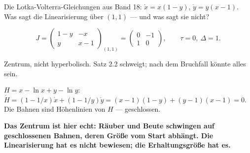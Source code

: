 \begin{aufgabe}
Die Lotka-Volterra-Gleichungen aus Band 18: $\dot x = x(1-y)$, $\dot y = y(x-1)$. Was sagt die Linearisierung über $(1,1)$ --- und was sagt sie nicht?

\loesung
{}
\[ J = \begin{pmatrix} 1-y & -x \\ y & x-1 \end{pmatrix}_{(1,1)} = \begin{pmatrix} 0 & -1 \\ 1 & 0 \end{pmatrix}, \qquad \tau = 0, \ \Delta = 1 . \]

Zentrum, nicht hyperbolisch. Satz 2.2 schweigt; nach dem Bruchfall könnte alles sein.

$H = x - \ln x + y - \ln y$: $\dot H = (1 - 1/x)\dot x + (1 - 1/y)\dot y = (x-1)(1-y) + (y-1)(x-1) = 0$. Die Bahnen sind Höhenlinien von $H$ --- geschlossen.

\begin{center}
\begin{minipage}{0.9\textwidth}
\textbf{Das Zentrum ist hier echt: Räuber und Beute schwingen auf geschlossenen Bahnen, deren Größe vom Start abhängt. Die Linearisierung hat es nicht bewiesen; die Erhaltungsgröße hat es.}
\end{minipage}
\end{center}

\begin{center}
\begin{minipage}{0.88\textwidth}
\end{minipage}
\end{center}
\end{aufgabe}

